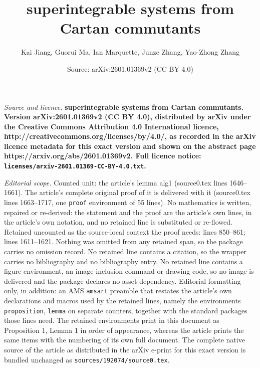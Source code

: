 \documentclass[10pt,a4paper]{amsart}
\title{\bf superintegrable systems from Cartan commutants}
\author{Kai Jiang, Guorui Ma, Ian Marquette, Junze Zhang, Yao-Zhong Zhang}
\date{Source: arXiv:2601.01369v2 (CC BY 4.0)}
\begin{document}
\maketitle

\noindent\emph{Source and licence.} \bf superintegrable systems from Cartan commutants. Version arXiv:2601.01369v2 (CC BY 4.0), distributed by arXiv under the Creative Commons Attribution 4.0 International licence, http://creativecommons.org/licenses/by/4.0/, as recorded in the arXiv licence metadata for this exact version and shown on the abstract page https://arxiv.org/abs/2601.01369v2. Full licence notice: \texttt{licenses/arxiv-2601.01369-CC-BY-4.0.txt}.\par\smallskip

\noindent\textit{Editorial scope.} Counted unit: the article's lemma alg1 (source0.tex lines 1646--1661). The article's complete original proof of it is delivered with it (source0.tex lines 1663--1717, one \texttt{proof} environment of 55 lines). No mathematics is written, repaired or re-derived: the statement and the proof are the article's own lines, in the article's own notation, and no retained line is substituted or re-flowed.  Retained uncounted as the source-local context the proof needs: lines 850--861; lines 1611--1621.  Nothing was omitted from any retained span, so the package carries no omission record.  No retained line contains a citation, so the wrapper carries no bibliography and no bibliography entry.  No retained line contains a figure environment, an image-inclusion command or drawing code, so no image is delivered and the package declares no asset dependency.  Editorial formatting only, in addition: an AMS \texttt{amsart} preamble that restates the article's own declarations and macros used by the retained lines, namely the environments \texttt{proposition}, \texttt{lemma} on separate counters, together with the standard packages those lines need.  The retained environments print in this document as Proposition 1, Lemma 1 in order of appearance, whereas the article prints the same items with the numbering of its own full document.  The complete native source of the article as distributed in the arXiv e-print for this exact version is bundled unchanged as \texttt{sources/192074/source0.tex}.
\end{document}
